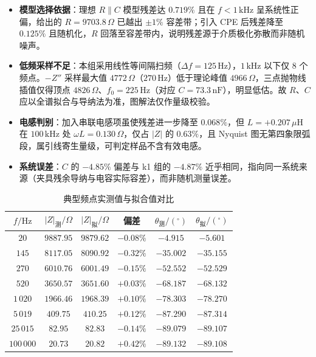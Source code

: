 \documentclass[12pt,a4paper]{ctexart}
\begin{document}
\begin{itemize}
    \item \textbf{模型选择依据}：理想 $R\parallel C$ 模型残差达 $0.719\%$ 且在 $f<1\,\mathrm{kHz}$ 呈系统性正偏，给出的 $R=9703.8\,\Omega$ 已越出 $\pm1\%$ 容差带；引入 CPE 后残差降至 $0.125\%$ 且随机化，$R$ 回落至容差带内，说明残差源于介质极化弥散而非随机噪声。
    \item \textbf{低频采样不足}：本组采用线性等间隔扫频（$\Delta f=125\,\mathrm{Hz}$），$1\,\mathrm{kHz}$ 以下仅 8 个频点。$-Z''$ 采样最大值 $4772\,\Omega$（$270\,\mathrm{Hz}$）低于理论峰值 $4966\,\Omega$，三点抛物线插值仅得顶点 $4826\,\Omega$、$f_0=225\,\mathrm{Hz}$（对应 $C=73.3\,\mathrm{nF}$），明显低估。故 $R$、$C$ 应以全谱拟合与导纳法为准，图解法仅作量级校验。
    \item \textbf{电感判别}：加入串联电感项虽使残差进一步降至 $0.068\%$，但 $L=+0.207\,\mu\mathrm{H}$ 在 $100\,\mathrm{kHz}$ 处 $\omega L=0.130\,\Omega$，仅占 $|Z|$ 的 $0.63\%$，且 Nyquist 图无第四象限弧段，属引线寄生量级，可判定样品不含有效电感。
    \item \textbf{系统误差}：$C$ 的 $-4.85\%$ 偏差与 k1 组的 $-4.87\%$ 近乎相同，指向同一系统来源（夹具残余导纳与电容实际容差），而非随机测量误差。
\end{itemize}

\begin{table}[htbp]\centering\small
\caption{典型频点实测值与拟合值对比}\label{tab:k2_pts}
\begin{tabular}{c|c|c|c|c|c}
\hline
$f/\mathrm{Hz}$ & $|Z|_{\text{测}}/\Omega$ & $|Z|_{\text{拟}}/\Omega$ & 偏差 & $\theta_{\text{测}}/(^\circ)$ & $\theta_{\text{拟}}/(^\circ)$ \\
\hline
$20$ & $9887.95$ & $9879.62$ & $-0.08\%$ & $-4.915$ & $-5.601$ \\
$145$ & $8117.05$ & $8090.92$ & $-0.32\%$ & $-35.002$ & $-35.155$ \\
$270$ & $6010.76$ & $6001.49$ & $-0.15\%$ & $-52.552$ & $-52.529$ \\
$520$ & $3650.57$ & $3651.60$ & $+0.03\%$ & $-68.187$ & $-68.132$ \\
$1\,020$ & $1966.46$ & $1968.39$ & $+0.10\%$ & $-78.303$ & $-78.270$ \\
$5\,019$ & $409.75$ & $410.25$ & $+0.12\%$ & $-87.290$ & $-87.314$ \\
$25\,015$ & $82.95$ & $82.83$ & $-0.14\%$ & $-89.079$ & $-89.107$ \\
$100\,000$ & $20.73$ & $20.82$ & $+0.42\%$ & $-89.132$ & $-89.108$ \\
\hline
\end{tabular}
\end{table}
\end{document}
